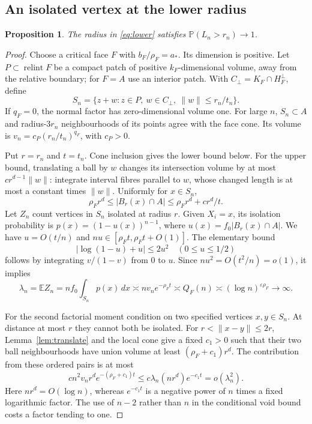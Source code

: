 \documentclass[11pt]{article}
\newtheorem{proposition}[theorem]{Proposition}
\theoremstyle{remark}
\newcommand{\Pp}{\mathbb P}
\newcommand{\E}{\mathbb E}
\newcommand{\relint}{\operatorname{relint}}
\begin{document}
\subsection{An isolated vertex at the lower radius}
\begin{proposition}\label{prop:isolate}
The radius in \eqref{eq:lower} satisfies $\Pp(L_n>r_n)\to1$.
\end{proposition}
\begin{proof}
Choose a critical face $F$ with $b_F/\rho_F=a_*$. Its dimension is positive.
Let $P\subset\relint F$ be a compact patch of positive $k_F$-dimensional
volume, away from the relative boundary; for $F=A$ use an interior patch.
With $C_\perp=K_F\cap H_F^\perp$, define
\[
 S_n=\{z+w:z\in P,\ w\in C_\perp,\ \|w\|\leq r_n/t_n\}.
\]
If $q_F=0$, the normal factor has zero-dimensional volume one.
For large $n$, $S_n\subset A$ and radius-$3r_n$ neighbourhoods of its points
agree with the face cone. Its volume is
$v_n=c_P(r_n/t_n)^{q_F}$, with $c_P>0$.

Put $r=r_n$ and $t=t_n$. Cone inclusion gives the lower bound below.
For the upper bound, translating a ball by $w$ changes its intersection
volume by at most $c r^{d-1}\|w\|$: integrate interval fibres parallel to
$w$, whose changed length is at most a constant times $\|w\|$.
Uniformly for $x\in S_n$,
\[
 \rho_Fr^d\leq|B_r(x)\cap A|\leq\rho_Fr^d+c r^d/t.
\]
Let $Z_n$ count vertices in $S_n$ isolated at radius $r$. Given $X_i=x$,
its isolation probability is
$p(x)=(1-u(x))^{n-1}$, where $u(x)=f_0|B_r(x)\cap A|$.
We have $u=O(t/n)$ and $nu\in[\rho_Ft,\rho_Ft+O(1)]$.
The elementary bound
\[
 |\log(1-u)+u|\leq2u^2\quad(0\leq u\leq1/2)
\]
follows by integrating $v/(1-v)$ from $0$ to $u$.
Since $nu^2=O(t^2/n)=o(1)$, it implies
\begin{equation}\label{eq:isolatemean}
 \lambda_n=\E Z_n=nf_0\int_{S_n}p(x)\,dx
 \asymp n v_n e^{-\rho_Ft}
 \asymp Q_F(n)\asymp(\log n)^{\varepsilon\rho_F}\longrightarrow\infty.
\end{equation}

For the second factorial moment condition on two specified vertices
$x,y\in S_n$. At distance at most $r$ they cannot both be isolated.
For $r<\|x-y\|\leq2r$, Lemma~\ref{lem:translate} and the local cone
give a fixed $c_1>0$ such that their two ball neighbourhoods have union
volume at least $(\rho_F+c_1)r^d$. The contribution from these ordered pairs
is at most
\[
 c n^2v_n r^d e^{-(\rho_F+c_1)t}
 \leq c\lambda_n(nr^d)e^{-c_1t}=o(\lambda_n^2).
\]
Here $nr^d=O(\log n)$, whereas $e^{-c_1t}$ is a negative power of $n$
times a fixed logarithmic factor. The use of $n-2$ rather than $n$ in the
conditional void bound costs a factor tending to one.


\end{proof}
\end{document}
